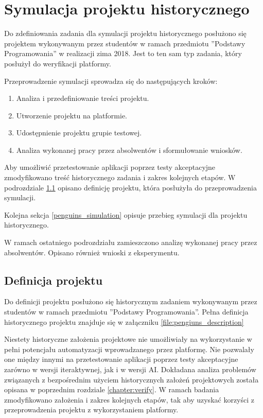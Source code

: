 \section{Symulacja projektu historycznego}
\label{research_penguins}

Do zdefiniowania zadania dla symulacji projektu historycznego posłużono się projektem wykonywanym przez studentów w ramach przedmiotu ”Podstawy Programowania” w realizacji zima 2018.
Jest to ten sam typ zadania, który posłużył do weryfikacji platformy.

Przeprowadzenie symulacji sprowadza się do następujących kroków:
\begin{enumerate}
    \item Analiza i przedefiniowanie treści projektu.
    \item Utworzenie projektu na platformie.
    \item Udostępnienie projektu grupie testowej.
    \item Analiza wykonanej pracy przez absolwentów i sformułowanie wniosków.
\end{enumerate}

Aby umożliwić przetestowanie aplikacji poprzez testy akceptacyjne zmodyfikowano treść historycznego zadania i zakres kolejnych etapów.
W podrozdziale \ref{penguins_project_definition} opisano definicję projektu, która posłużyła do przeprowadzenia symulacji.

Kolejna sekcja \ref{penguins_simulation} opisuje przebieg symulacji dla projektu historycznego.

W ramach ostatniego podrozdziału zamieszczono analizę wykonanej pracy przez absolwentów.
Opisano również wnioski z eksperymentu.


\subsection{Definicja projektu}
\label{penguins_project_definition}

Do definicji projektu posłużono się historycznym zadaniem wykonywanym przez studentów w ramach przedmiotu ”Podstawy Programowania”.
Pełna definicja historycznego projektu znajduje się w załączniku \ref{file:pengiuns_description}

Niestety historyczne założenia projektowe nie umożliwiały na wykorzystanie w pełni potencjału automatyzacji wprowadzanego przez platformę.
Nie pozwalały one między innymi na przetestowanie aplikacji poprzez testy akceptacyjne zarówno w wersji iteraktywnej, jak i w wersji AI.
Dokładana analiza problemów związanych z bezpośrednim użyciem historycznych założeń projektowych została opisana w poprzednim rozdziale \ref{chapter:verify}.
W ramach badania zmodyfikowano założenia i zakres kolejnych etapów, tak aby uzyskać korzyści z przeprowadzenia projektu z wykorzystaniem platformy.

